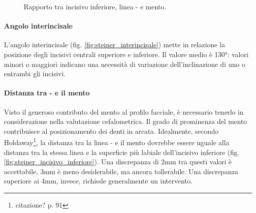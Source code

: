 \begin{figure}[p!]
\begin{minipage}{.44\textwidth}
 \caption{Rapporto tra incisivo inferiore, linea - e mento.}
 \label{fig:steiner_incisivo_inferiore}
\end{minipage}
\end{figure}

\paragraph{Angolo interincisale}
L'angolo interincisale (fig. \vref{fig:steiner_interincisale}) mette in relazione la posizione degli incisivi centrali superiore e inferiore. Il valore medio è 130°: valori minori o maggiori indicano una necessità di variazione dell'inclinazione di uno o entrambi gli incisivi.

\paragraph{Distanza tra - e il mento}
Visto il generoso contributo del mento al profilo facciale, è necessario tenerlo in considerazione nella valutazione cefalometrica. Il grado di prominenza del mento contribuisce al posizionamento dei denti in arcata. Idealmente, secondo Holdaway\footnote{citazione? p. 91}, la distanza tra la linea - e il mento dovrebbe essere uguale alla distanza tra la stessa linea e la superficie più labiale dell'incisivo inferiore (fig. \vref{fig:steiner_incisivo_inferiore}). Una discrepanza di 2mm tra questi valori è accettabile, 3mm è meno desiderabile, ma ancora tollerabile. Una discrepanza superiore ai 4mm, invece, richiede generalmente un intervento.

